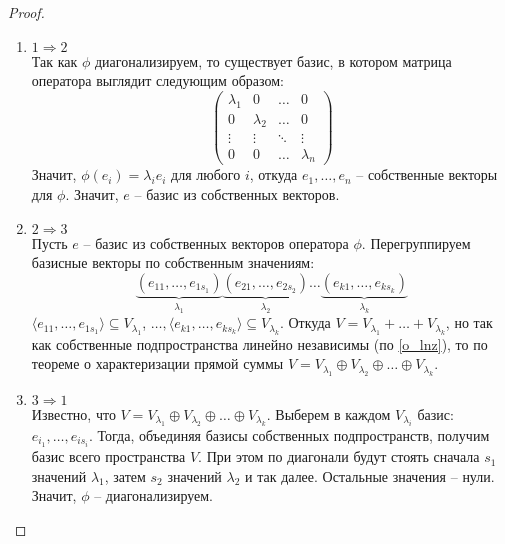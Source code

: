 \begin{proof}~
    \begin{enumerate}
        \item $1 \Rightarrow 2$ \\
        Так как $\phi$ диагонализируем, то существует базис, в котором матрица оператора выглядит 
        следующим образом:
        \begin{equation*}
        \left(
            \begin{array}{cccc}
            \lambda_{1} & 0 & \ldots & 0\\
            0 & \lambda_{2} & \ldots & 0\\
            \vdots & \vdots & \ddots & \vdots\\
            0 & 0 & \ldots & \lambda_n
            \end{array}
        \right)
        \end{equation*}
        Значит, $\phi(e_i) = \lambda_i e_i$ для любого $i$, откуда $e_1, \dots, e_n$ -- собственные 
        векторы для $\phi$. Значит, $e$ -- базис из собственных векторов.
        \item $2 \Rightarrow 3$ \\
        Пусть $e$ -- базис из собственных векторов оператора $\phi$. Перегруппируем базисные векторы 
        по собственным значениям: 
        $$\underbrace{(e_{11}, \dots, e_{1s_1})}_{\lambda_1} \underbrace{(e_{21}, \dots, e_{2s_2})}_{\lambda_2} 
        \dots \underbrace{(e_{k1}, \dots, e_{ks_k})}_{\lambda_k}$$
        $\langle e_{11}, \dots, e_{1s_1} \rangle \subseteq V_{\lambda_1}$, 
        $\dots, \langle e_{k1}, \dots, e_{ks_k} \rangle \subseteq V_{\lambda_k}$. 
        Откуда $V = V_{\lambda_1} + \dots + V_{\lambda_k}$, но так как собственные подпространства 
        линейно независимы (по \ref{o_lnz}), то по теореме о характеризации прямой суммы 
        $V = V_{\lambda_1} \oplus V_{\lambda_2} \oplus \dots \oplus V_{\lambda_k}$.
        \item $3 \Rightarrow 1$ \\
        Известно, что $V = V_{\lambda_1} \oplus V_{\lambda_2} \oplus \dots \oplus V_{\lambda_k}$. 
        Выберем в каждом $V_{\lambda_i}$ базис: $e_{i_1}, \dots, e_{is_i}$. Тогда, объединяя базисы 
        собственных подпространств, получим базис всего пространства $V$. 
        При этом по диагонали будут стоять сначала $s_1$ значений $\lambda_1$, 
        затем $s_2$ значений $\lambda_2$ и так далее. Остальные значения -- нули. 
        Значит, $\phi$ -- диагонализируем.
        \begin{equation*}

\end{equation*}
\end{enumerate}
\end{proof}
